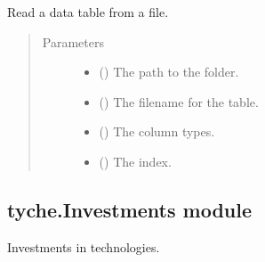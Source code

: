 \documentclass[letterpaper,10pt,english]{sphinxmanual}
\begin{document}
\begin{fulllineitems}
\label{\detokenize{doc-src/tyche:tyche.IO.read_table}}
Read a data table from a file.
\begin{quote}\begin{description}
\item[{Parameters}] \leavevmode\begin{itemize}
\item {} 
 () \textendash{} The path to the folder.

\item {} 
 () \textendash{} The filename for the table.

\item {} 
 () \textendash{} The column types.

\item {} 
 () \textendash{} The index.

\end{itemize}

\end{description}\end{quote}

\end{fulllineitems}



\subsection{tyche.Investments module}
\label{\detokenize{doc-src/tyche:module-tyche.Investments}}\label{\detokenize{doc-src/tyche:tyche-investments-module}}
Investments in technologies.
\end{document}
